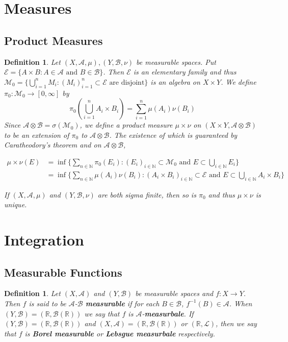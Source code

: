 \documentclass[12pt]{amsart}
\newtheorem{defn}[thm]{Definition}
\newcommand{\sig}{\sigma}
\newcommand{\N}{\mathbb{N}}
\newcommand{\R}{\mathbb{R}}
\newcommand{\MA}{\mathcal{A}}
\newcommand{\MB}{\mathcal{B}}
\newcommand{\ML}{\mathcal{L}}
\newcommand{\ME}{\mathcal{E}}
\newcommand{\MM}{\mathcal{M}}
\newcommand{\RG}{[0,\infty]}
\begin{document}
\section{Measures}

\subsection{Product Measures}

\begin{defn}
Let $(X,\MA, \mu), (Y,\MB, \nu)$ be measurable spaces. Put $\ME = \{A \times B: A \in \MA \text{ and } B \in \MB\}$. Then $\ME$ is an elementary family and thus $\MM_0 = \{\bigcup_{i =1}^n M_i: (M_i)_{i=1 }^n \subset \ME \text{ are disjoint}\}$ is an algebra on $X \times Y$. We define $\pi_0: \MM_0 \rightarrow \RG$ by $$\pi_0(\bigcup_{i=1}^n A_i \times B_i) = \sum_{i=1}^n\mu(A_i)\nu(B_i)$$ Since $\MA \otimes \MB = \sig(\MM_0)$, we define a product measure $\mu \times \nu$ on $(X \times Y, \MA \otimes \MB)$ to be an extension of $\pi_0$ to $\MA \otimes \MB$. The existence of which is guaranteed by Caratheodory's theorem and on $\MA \otimes \MB$, 

\begin{align*}
\mu \times \nu(E) 
&= \inf \{\sum_{n \in \N}\pi_0(E_i): (E_i)_{i \in \N} \subset \MM_0 \text{ and } E \subset \bigcup_{i \in \N} E_i\}\\
&= \inf \{\sum_{n \in \N}\mu(A_i)\nu(B_i): (A_i \times B_i)_{i \in \N} \subset \ME \text{ and } E \subset \bigcup_{i \in \N} A_i \times B_i \}
\end{align*}

If $(X,\MA, \mu)$ and $(Y,\MB, \nu)$ are both sigma finite, then so is $\pi_0$ and thus $\mu \times \nu$ is unique.
\end{defn}

\section{Integration}

\subsection{Measurable Functions}

\begin{defn}
Let $(X,\MA)$ and $(Y, \MB)$ be measurable spaces and $f:X \rightarrow Y$. Then $f$ is said to be $\MA$-$\MB$ \textbf{measurable} if for each $B \in \MB$, $f^{-1}(B) \in \MA$. When $(Y, \MB) = (\R, \MB(\R))$ we say that $f$ is $\MA$-\textbf{measurbale}. If $(Y,\MB) = (\R, \MB(\R))$ and $(X,\MA) = (\R, \MB(\R))$ or $(\R, \ML)$, then we say that $f$ is \textbf{Borel measurable} or \textbf{Lebsgue measurbale} respectively.
\end{defn}
\end{document}

